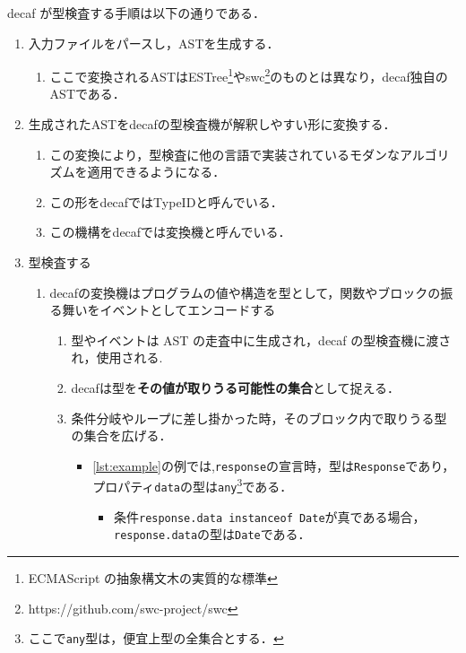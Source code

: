 decaf が型検査する手順は以下の通りである．

\begin{enumerate}
    \item 入力ファイルをパースし，ASTを生成する．
          \begin{enumerate}
              \item ここで変換されるASTはESTree\footnote{ECMAScript の抽象構文木の実質的な標準}やswc\footnote{https://github.com/swc-project/swc}のものとは異なり，decaf独自のASTである．
          \end{enumerate}
    \item 生成されたASTをdecafの型検査機が解釈しやすい形に変換する．
          \begin{enumerate}
              \item この変換により，型検査に他の言語で実装されているモダンなアルゴリズムを適用できるようになる．
              \item この形をdecafではTypeIDと呼んでいる．
              \item この機構をdecafでは変換機と呼んでいる．
          \end{enumerate}
    \item 型検査する
          \begin{enumerate}
              \item decafの変換機はプログラムの値や構造を型として，関数やブロックの振る舞いをイベントとしてエンコードする
                    \begin{enumerate}
                        \item 型やイベントは AST の走査中に生成され，decaf の型検査機に渡され，使用される.
                        \item decafは型を\textbf{その値が取りうる可能性の集合}として捉える．
                        \item 条件分岐やループに差し掛かった時，そのブロック内で取りうる型の集合を広げる．
                              \begin{itemize}
                                  \item \ref{lst:example}の例では,\texttt{response}の宣言時，型は\texttt{Response}であり，プロパティ\texttt{data}の型は\texttt{any}\footnote{ここで\texttt{any}型は，便宜上型の全集合とする．}である．
                                        \begin{itemize}
                                            \item 条件\texttt{response.data instanceof Date}が真である場合，\texttt{response.data}の型は\texttt{Date}である．

\end{itemize}
\end{itemize}
\end{enumerate}
\end{enumerate}
\end{enumerate}
